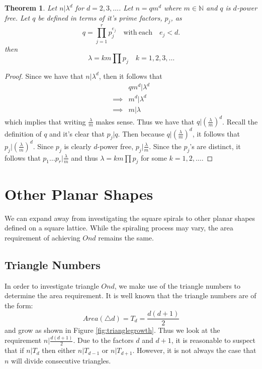 \documentclass[11pt,reqno]{amsart}
\theoremstyle{mydef}
\newtheorem{thm}{Theorem}[section]
\begin{document}
\begin{thm}
\label{dimdthm}
Let $n\vert \lambda^d$ for $d=2, 3, \ldots$. Let $n = qm^d$ where $m \in \mathbb{N}$ and $q$ is $d$-power 
free. Let $q$ be defined in terms of it's prime factors, $p_j$, as
\[
	q = \prod\limits_{j=1}^{r} p_j^{e_j}\quad \text{with}\ \text{each}\quad e_j < d.
\]
then
\[
	\lambda = k m \prod p_j \quad k = 1, 2, 3, \ldots
\]
\end{thm}

\begin{proof}
Since we have that $n \vert \lambda^d$, then it follows that
\begin{align*}
  & qm^d \vert \lambda^d\\
\implies & m^d \vert \lambda^d\\
\implies & m \vert \lambda 
\end{align*}
which implies that writing $\frac{\lambda}{m}$ makes sense. Thus we have 
that $q \vert (\frac{\lambda}{m})^d$. Recall the definition of $q$ and it's clear
that $p_j \vert q$. Then because $q \vert (\frac{\lambda}{m})^d$, it follows that
$p_j \vert (\frac{\lambda}{m})^d$.  Since $p_j$ is clearly $d$-power free, $p_j \vert \frac{\lambda}{m}$.
Since the $p_j$'s are distinct, it follows that $p_1 \dots p_r \vert \frac{\lambda}{m}$ 
and thus $\lambda = k m \prod p_j$ for some $k = 1, 2, \ldots$.
\end{proof}

\section{Other Planar Shapes}

We can expand away from investigating the square spirals to other planar shapes
defined on a square lattice. While the spiraling process may vary, the area
requirement of achieving $Ond$ remains the same.

\subsection{Triangle Numbers}

In order to investigate triangle $Ond$, we make use of the triangle numbers \cite{TriangleNumbers}
to determine the area requirement. It is well known that the triangle numbers are of the form:
\[
	Area(\triangle d) =  T_d =  \frac{d(d+1)}{2}
\]
and grow as shown in Figure \ref{fig:trianglegrowth}. Thus we look at the requirement 
$n \vert \frac{d(d+1)}{2}$. Due to the factors $d$ and $d+1$, it is reasonable to suspect
that if $n \vert T_d$ then either $n \vert T_{d-1}$ or $n \vert T_{d+1}$. However, it is not
always the case that $n$ will divide consecutive triangles.
\end{document}
